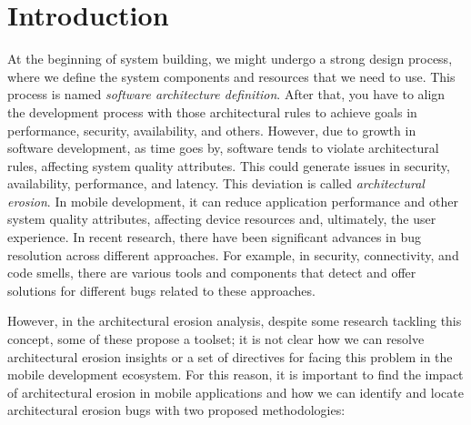 
\chapter{Introduction}
\label{cha:introduction}

At the beginning of system building, we might undergo a strong design process, where we define the system components and resources that we need to use. This process is named \emph{software architecture definition}. After that, you have to align the development process with those architectural rules to achieve goals in performance, security, availability, and others.
However, due to growth in software development, as time goes by, software tends to violate architectural rules, affecting system quality attributes. This could generate issues in security, availability, performance, and latency. This deviation is called \emph{architectural erosion}. In mobile development, it can reduce application performance and other system quality attributes, affecting device resources and, ultimately, the user experience.
In recent research, there have been significant advances in bug resolution across different approaches. For example, in security, connectivity, and code smells, there are various tools and components that detect and offer solutions for different bugs related to these approaches.

However, in the architectural erosion analysis, despite some research tackling this concept, some of these propose a toolset; it is not clear how we can resolve architectural erosion insights or a set of directives for facing this problem in the mobile development ecosystem. For this reason, it is important to find the impact of architectural erosion in mobile applications and how we can identify and locate architectural erosion bugs with two proposed methodologies:  

